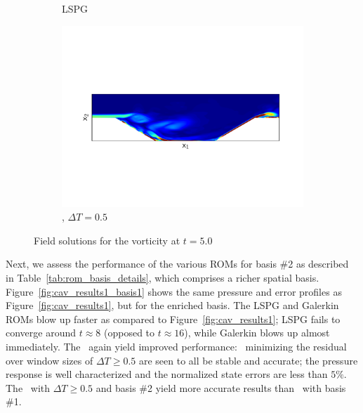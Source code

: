 \begin{figure}
\begin{center}
\begin{subfigure}[t]{0.95\textwidth}
\caption{LSPG} 
\end{subfigure}
\begin{subfigure}[t]{0.95\textwidth}
\includegraphics[trim={0cm 3.9cm 0cm 3.9cm},clip,width=1.\linewidth]{figs/cavity/u_c5_t5_basis2.pdf}
\caption{\methodAcronym, $\Delta T = 0.5$} 
\end{subfigure}
\caption{Field solutions for the vorticity at $t = 5.0$}
\label{fig:cav_snapshots}
\end{center}
\end{figure}


Next, we assess the performance of the various ROMs for basis \#2 as described in Table~\ref{tab:rom_basis_details}, which comprises a richer spatial basis.
 Figure~\ref{fig:cav_results1_basis1} shows the same pressure and error profiles as Figure~\ref{fig:cav_results1}, but for the enriched basis. The LSPG and Galerkin ROMs blow up faster as compared to Figure~\ref{fig:cav_results1}; LSPG fails to converge around $t \approx 8$ (opposed to $t \approx 16$), while Galerkin blows up almost immediately. The 
\methodAcronymROMs\ again yield improved performance: \methodAcronymROMs\ minimizing the residual over window sizes of $\Delta T \ge 0.5$ are seen to all be stable and accurate; the pressure response is well characterized and the normalized state errors are less than $5\%$. The \methodAcronymROMs\ with $\Delta T \ge 0.5$ and basis \#2 yield more accurate results than \methodAcronymROMs\ with basis \#1.
 

